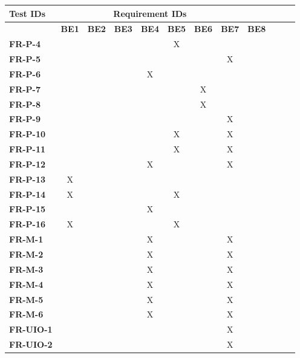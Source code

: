 \documentclass[12pt, titlepage]{article}
\begin{document}
\begin{table}[H]
    \centering
    \begin{adjustbox}{max width=0.7\paperwidth}
    \begin{tabular}{l|ccccccccccc}
        \textbf{Test IDs} & \multicolumn{7}{c}{\textbf{Requirement IDs}}\\
        \hline
        ~ & \textbf{BE1} & \textbf{BE2} & \textbf{BE3} & \textbf{BE4} & \textbf{BE5} & \textbf{BE6} & \textbf{BE7} & \textbf{BE8}\\
        \textbf{FR-P-4}    & ~ & ~ & ~ & ~ & X & ~ & ~ & ~\\
        \textbf{FR-P-5}    & ~ & ~ & ~ & ~ & ~ & ~ & X & ~\\
        \textbf{FR-P-6}    & ~ & ~ & ~ & X & ~ & ~ & ~ & ~\\
        \textbf{FR-P-7}    & ~ & ~ & ~ & ~ & ~ & X & ~ & ~\\
        \textbf{FR-P-8}    & ~ & ~ & ~ & ~ & ~ & X & ~ & ~\\
        \textbf{FR-P-9}    & ~ & ~ & ~ & ~ & ~ & ~ & X & ~\\
        \textbf{FR-P-10}   & ~ & ~ & ~ & ~ & X & ~ & X & ~\\
        \textbf{FR-P-11}   & ~ & ~ & ~ & ~ & X & ~ & X & ~\\
        \textbf{FR-P-12}   & ~ & ~ & ~ & X & ~ & ~ & X & ~\\
        \textbf{FR-P-13}   & X & ~ & ~ & ~ & ~ & ~ & ~ & ~\\
        \textbf{FR-P-14}   & X & ~ & ~ & ~ & X & ~ & ~ & ~\\
        \textbf{FR-P-15}   & ~ & ~ & ~ & X & ~ & ~ & ~ & ~\\
        \textbf{FR-P-16}   & X & ~ & ~ & ~ & X & ~ & ~ & ~\\
        \textbf{FR-M-1}    & ~ & ~ & ~ & X & ~ & ~ & X & ~\\
        \textbf{FR-M-2}    & ~ & ~ & ~ & X & ~ & ~ & X & ~\\
        \textbf{FR-M-3}    & ~ & ~ & ~ & X & ~ & ~ & X & ~\\
        \textbf{FR-M-4}    & ~ & ~ & ~ & X & ~ & ~ & X & ~\\
        \textbf{FR-M-5}    & ~ & ~ & ~ & X & ~ & ~ & X & ~\\
        \textbf{FR-M-6}    & ~ & ~ & ~ & X & ~ & ~ & X & ~\\
        \textbf{FR-UIO-1}  & ~ & ~ & ~ & ~ & ~ & ~ & X & ~\\
        \textbf{FR-UIO-2}  & ~ & ~ & ~ & ~ & ~ & ~ & X & ~\\

\end{tabular}
\end{adjustbox}
\end{table}
\end{document}
